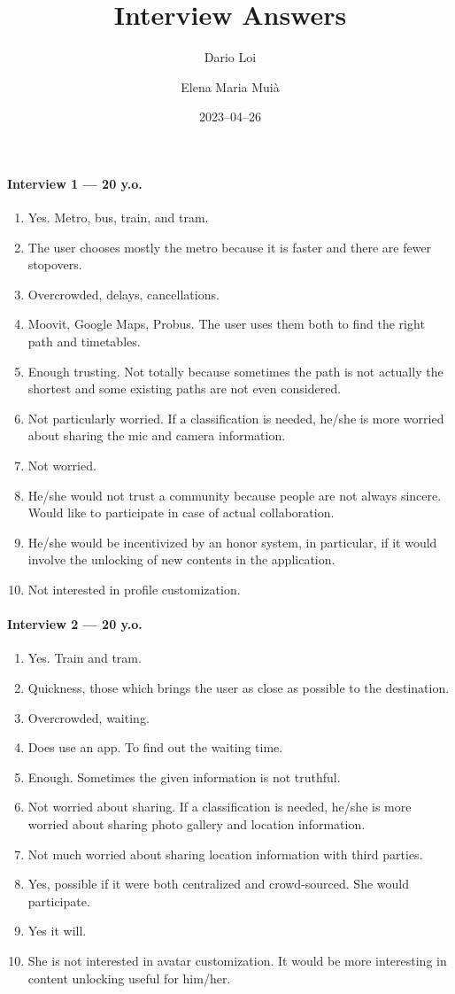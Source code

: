 \documentclass[a4paper, 11pt, twocolumn]{article}
\title{Interview Answers}
\author{Dario Loi \and Elena Maria Muià}
\date{2023--04--26}
\begin{document}
\maketitle
\paragraph*{Interview 1 --- 20 y.o.}
\begin{enumerate}
	\item Yes. Metro, bus, train, and tram.
	\item The user chooses mostly the metro because it is faster and there are fewer stopovers.
	\item Overcrowded, delays, cancellations.
	\item Moovit, Google Maps, Probus. The user uses them both to find the right path and timetables.
	\item Enough trusting. Not totally because sometimes the path is not actually the shortest and some existing paths are not even considered.
	\item Not particularly worried. If a classification is needed, he/she is more worried about sharing the mic and camera information.
	\item Not worried.
	\item He/she would not trust a community because people are not always sincere. Would like to participate in case of actual collaboration.
	\item He/she would be incentivized by an honor system, in particular, if it would involve the unlocking of new contents in the application.
	\item Not interested in profile customization.

\end{enumerate}

\paragraph*{Interview 2 --- 20 y.o.}
\begin{enumerate}
	\item Yes. Train and tram.
	\item Quickness, those which brings the user as close as possible to the destination.
	\item Overcrowded, waiting.
	\item Does use an app. To find out the waiting time.
	\item Enough. Sometimes the given information is not truthful.
	\item Not worried about sharing. If a classification is needed, he/she is more worried about sharing photo gallery and location information.
	\item Not much worried about sharing location information with third parties.
	\item Yes, possible if it were both centralized and crowd-sourced. She would participate.
	\item Yes it will.
	\item She is not interested in avatar customization. It would be more interesting in content unlocking useful for him/her.
\end{enumerate}
\end{document}
